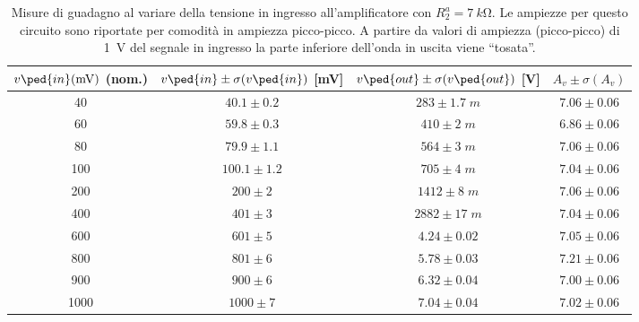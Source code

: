 \documentclass[10pt,a4paper]{article}
\begin{document}
\begin{table}[htbp]
\centering
\begin{tabular}{cccc}
\toprule
$v\ped{in}(\si{m\V})$ (nom.) & $v\ped{in} \pm \sigma(v\ped{in})$ [mV] & $v\ped{out} \pm \sigma(v\ped{out})$ [V] & $A_v \pm \sigma(A_v)$ \\
\midrule
\midrule
40 & $40.1 \pm 0.2$ & $283 \pm 1.7 \; \si{m}$ & $7.06 \pm 0.06$ \\
60 & $59.8 \pm 0.3$ & $410 \pm 2 \; \si{m}$ & $6.86 \pm 0.06$ \\
80 & $79.9 \pm 1.1$ & $564 \pm 3 \; \si{m}$ & $7.06 \pm 0.06$ \\
100 & $100.1 \pm 1.2$ & $705 \pm 4 \; \si{m}$ & $7.04 \pm 0.06$ \\
200 & $200 \pm 2$ & $1412 \pm 8 \; \si{m}$ & $7.06 \pm 0.06$ \\
400 & $401 \pm 3$ & $2882 \pm 17 \; \si{m}$ & $7.04 \pm 0.06$ \\
600 & $601 \pm 5$ & $4.24 \pm 0.02$ & $7.05 \pm 0.06$ \\
800 & $801 \pm 6$ & $5.78 \pm 0.03$ & $7.21 \pm 0.06$ \\
900 & $900 \pm 6$ & $6.32 \pm 0.04$ & $7.00 \pm 0.06$ \\
1000 & $1000 \pm 7$ & $7.04 \pm 0.04$ & $7.02 \pm 0.06$ \\
\bottomrule
\end{tabular} 
\caption{Misure di guadagno al variare della tensione in ingresso
all'amplificatore con $R_2^a = \SI{7}{k\ohm}$. Le ampiezze per questo
circuito sono riportate per comodità in ampiezza picco-picco. A partire
da valori di ampiezza (picco-picco) di \SI{1}{\V} del segnale in ingresso la
parte inferiore dell'onda in uscita viene ``tosata''. \label{tab: gain_M}}
\end{table}
\end{document}
